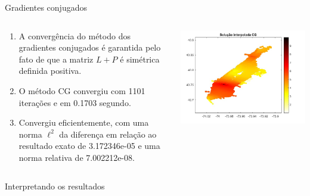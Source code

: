 \documentclass{beamer} %
\theoremstyle{definition}
\begin{document}
    \begin{frame}{Gradientes conjugados}
        \pause
        \begin{columns}
            \begin{column}{0.5\textwidth}            
                \begin{enumerate}
                    \item A convergência do método dos gradientes conjugados é garantida pelo fato de que a matriz  $L + P$ é simétrica definida positiva.
                    \pause
                    \item  O método CG convergiu com 1101 iterações e em 0.1703 segundo.
                    \pause
                    \item Convergiu eficientemente, com uma norma $\mathcal{\ell}^2$ da diferença em relação ao resultado exato de 3.172346e-05 e uma norma relativa de 7.002212e-08.
                    \pause
                \end{enumerate}
            \end{column}
            \begin{column}{0.5\textwidth}
                \centering
                \includegraphics[width=\textwidth]{CGinterpol.jpeg}
            \end{column}
        \end{columns}
    \end{frame}

    \begin{frame}{Interpretando os resultados}

    \end{frame}
\end{document}
